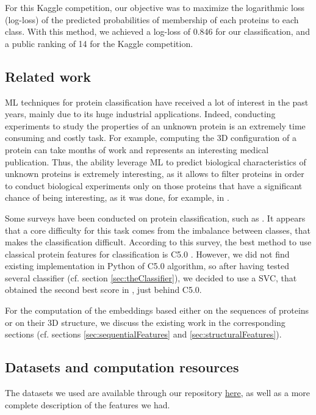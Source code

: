 \documentclass[final]{cvpr}
\begin{document}
For this Kaggle competition, our objective was to maximize the logarithmic loss (log-loss) of the predicted probabilities of membership of each proteins to each class. With this method, we achieved a log-loss of 0.846 for our classification, and a public ranking of 14 for the Kaggle competition. 

\subsection{Related work}

ML techniques for protein classification have received a lot of interest in the past years, mainly due to its huge industrial applications. Indeed, conducting experiments to study the properties of an unknown protein is an extremely time consuming and costly task. For example, computing the 3D configuration of a protein can take months of work and represents an interesting medical publication. Thus, the ability leverage ML to predict biological characteristics of unknown proteins is extremely interesting, as it allows to filter proteins in order to conduct biological experiments only on those proteins that have a significant chance of being interesting, as it was done, for example, in \cite{Naik2016}.

Some surveys have been conducted on protein classification, such as \cite{surveyClassifProt}. It appears that a core difficulty for this task comes from the imbalance between classes, that makes the classification difficult. According to this survey, the best method to use classical protein features for classification is C5.0 \cite{PANG2009}. However, we did not find existing implementation in Python of C5.0 algorithm, so after having tested several classifier (cf. section \ref{sec:theClassifier}), we decided to use a SVC, that obtained the second best score in \cite{PANG2009}, just behind C5.0. 

For the computation of the embeddings based either on the sequences of proteins or on their 3D structure, we discuss the existing work in the corresponding sections (cf. sections \ref{sec:sequentialFeatures} and \ref{sec:structuralFeatures}). 
   
\subsection{Datasets and computation resources} \label{datasets}

 The datasets we used are available through our repository \href{https://github.com/DentanJeremie/Altegrad-Protein-Prediction.git}{here}, as well as a more complete description of the features we had.
 
\end{document}

